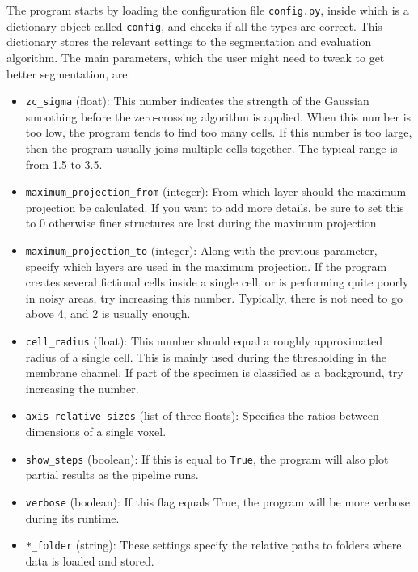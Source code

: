 \documentclass[
  digital,     %
  oneside,     %
  nosansbold,  %
  nocolorbold, %
  lof,         %
  lot,         %
]{fithesis4}
\begin{document}
The program starts by loading the configuration file \texttt{config.py}, inside
which is a dictionary object called \texttt{config}, and checks if all the types are
correct. This dictionary stores the
relevant settings to the segmentation and evaluation algorithm. The main parameters, which the
user might need to tweak to get better segmentation, are:
\begin{itemize}
    \item \texttt{zc\_sigma} (float): This number indicates the strength of the
        Gaussian smoothing before the zero-crossing algorithm is applied. When this
        number is too low, the program tends to find too many cells. If this number is 
        too large, then the program usually joins multiple cells together. The typical
        range is from 1.5 to 3.5.
    \item \texttt{maximum\_projection\_from} (integer): From which layer should
        the maximum projection be calculated. If you want to add more details, be sure
        to set this to 0 otherwise finer structures are lost during the maximum
        projection.
    \item \texttt{maximum\_projection\_to} (integer): Along with the previous
        parameter, specify which layers are used in the maximum projection. If the
        program creates several fictional cells inside a single cell, or is performing
        quite poorly in noisy areas, try increasing this number. Typically, there
        is not need to go above 4, and 2 is usually enough.
    \item \texttt{cell\_radius} (float): This number should equal a roughly
        approximated radius of a single cell. This is mainly used during the
        thresholding in the membrane channel. If part of the specimen is
        classified as a background, try increasing the number.
    \item \texttt{axis\_relative\_sizes} (list of three floats): Specifies the
        ratios between dimensions of a single voxel.
    \item \texttt{show\_steps} (boolean): If this is equal to \texttt{True},
        the program will also plot partial results as the pipeline runs.
    \item \texttt{verbose} (boolean): If this flag equals True, the program
        will be more verbose during its runtime.
    \item \texttt{*\_folder} (string): These settings specify the relative paths
        to folders where data is loaded and stored.
\end{itemize}
\end{document}
